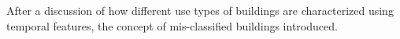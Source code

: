 After a discussion of how different use types of buildings are characterized using temporal features, the concept of mis-classified buildings introduced.